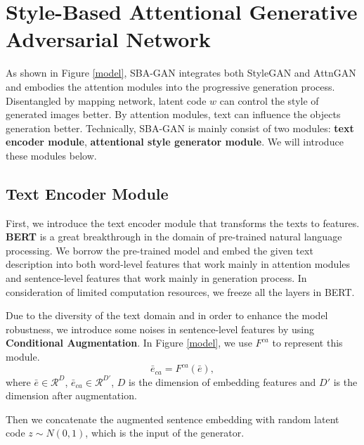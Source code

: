 \documentclass{article}
\begin{document}
\section{Style-Based Attentional Generative Adversarial Network}
As shown in Figure \ref{model}, SBA-GAN integrates both StyleGAN\cite{stylegan} and AttnGAN\cite{attngan} and embodies the attention modules into the progressive generation process. Disentangled by mapping network, latent code $w$ can control the style of generated images better. By attention modules, text can influence the objects generation better. Technically, SBA-GAN is mainly consist of two modules: \textbf{text encoder module}, \textbf{attentional style generator module}. We will introduce these modules below.


\subsection{Text Encoder Module}
First, we introduce the text encoder module that transforms the texts to features. \textbf{BERT}\cite{bert} is a great breakthrough in the domain of pre-trained natural language processing. We borrow the pre-trained model and embed the given text description into both word-level features that work mainly in attention modules and sentence-level features that work mainly in generation process. In consideration of limited computation resources, we freeze all the layers in BERT.

Due to the diversity of the text domain and in order to enhance the model robustness, we introduce some noises in sentence-level features by using \textbf{Conditional Augmentation}\cite{stackgan}. In Figure \ref{model}, we use $F^{ca}$ to represent this module.
\begin{equation}
    \bar{e}_{ca} = F^{ca}(\bar{e}),
\end{equation}
where $\bar{e} \in \mathcal{R}^{D}$, $\bar{e}_{ca} \in \mathcal{R}^{D'}$, $D$ is the dimension of embedding features and $D'$ is the dimension after augmentation.

Then we concatenate the augmented sentence embedding with random latent code $z \sim N(0,1)$, which is the input of the generator.
\end{document}
